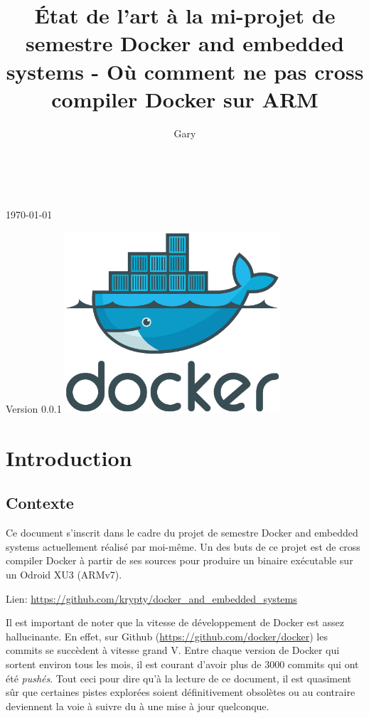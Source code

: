 \documentclass[11pt,a4paper,oneside]{report}
\title{État de l'art à la mi-projet de semestre Docker and embedded systems - Où comment ne pas cross compiler Docker sur ARM}
\author{Gary \bsc{Marigliano}}
\begin{document}
\begin{titlepage}
  \centering
  \vfill
  \LARGE \thetitle\\[0.8cm]

  \Large \theauthor\\[0.8cm]

  \normalsize \today 

  Version 0.0.1
  \vfill
  \includegraphics[width=8cm]{img/docker_logo}
  \vfill
\end{titlepage}

\tableofcontents
{}

\chapter{Introduction}

\section{Contexte}\label{contexte}

Ce document s'inscrit dans le cadre du projet de semestre Docker and embedded systems actuellement réalisé par moi-même. Un des buts de ce projet est de cross compiler Docker à partir de ses sources pour produire un binaire exécutable sur un Odroid XU3 (ARMv7).

Lien: \url{https://github.com/krypty/docker_and_embedded_systems}

Il est important de noter que la vitesse de développement de Docker est assez hallucinante. En effet, sur Github (\url{https://github.com/docker/docker}) les commits se succèdent à vitesse grand V. Entre chaque version de Docker qui sortent environ tous les mois, il est courant d'avoir plus de 3000 commits qui ont été \emph{pushés}. Tout ceci pour dire qu'à la lecture de ce document, il est quasiment sûr que certaines pistes explorées soient définitivement obsolètes ou au contraire deviennent la voie à suivre du à une mise à jour quelconque.
\end{document}
